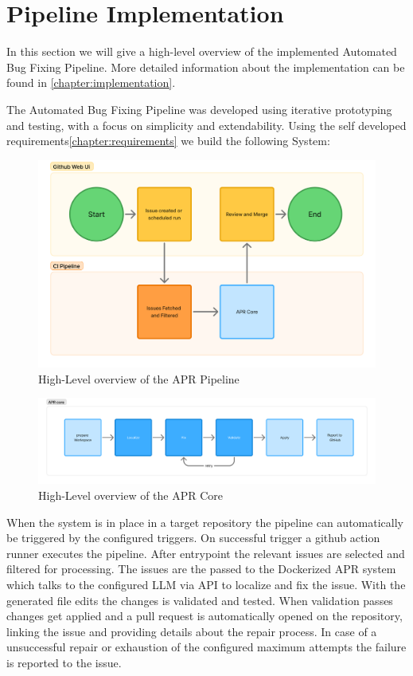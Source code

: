 \section{Pipeline Implementation}
In this section we will give a high-level overview of the implemented Automated Bug Fixing Pipeline. More detailed information about the implementation can be found in \ref{chapter:implementation}.

The Automated Bug Fixing Pipeline was developed using iterative prototyping and testing, with a focus on simplicity and extendability. Using the self developed requirements\ref{chapter:requirements} we build the following System:

\begin{figure}[H]
    \centering
    \includegraphics[width=1\textwidth]{images/flowcharts/high-level.png}
    \caption{High-Level overview of the APR Pipeline}
    \label{fig:high-level}
\end{figure}

\begin{figure}[H]
    \centering
    \includegraphics[width=1\textwidth]{images/flowcharts/agent-core-high-level.png}
    \caption{High-Level overview of the APR Core}
    \label{fig:apr-core-high-level}
\end{figure}

When the system is in place in a target repository the pipeline can automatically be triggered by the configured triggers. On successful trigger a github action runner executes the pipeline. After entrypoint the relevant issues are selected and filtered for processing. The issues are the passed to the Dockerized APR system which talks to the configured LLM via API to localize and fix the issue. With the generated file edits the changes is validated and tested. When validation passes changes get applied and a pull request is automatically opened on the repository, linking the issue and providing details about the repair process. In case of a unsuccessful repair or exhaustion of the configured maximum attempts the failure is reported to the issue.

